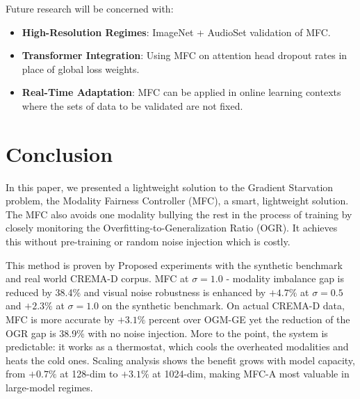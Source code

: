 \documentclass[fleqn,10pt]{wlscirep}
\begin{document}
Future research will be concerned with:
\begin{itemize}
    \item \textbf{High-Resolution Regimes}: ImageNet + AudioSet \cite{gemmeke2017audio} validation of MFC.
    \item \textbf{Transformer Integration}: Using MFC on attention head dropout rates in place of global loss weights.
    \item \textbf{Real-Time Adaptation}: MFC can be applied in online learning contexts where the sets of data to be validated are not fixed.
\end{itemize}

\section{Conclusion}
In this paper, we presented a lightweight solution to the Gradient Starvation problem, the Modality Fairness Controller (MFC), a smart, lightweight solution. The MFC also avoids one modality bullying the rest in the process of training by closely monitoring the Overfitting-to-Generalization Ratio (OGR). It achieves this without pre-training or random noise injection which is costly.

This method is proven by Proposed experiments with the synthetic benchmark and real world CREMA-D corpus. MFC at $\sigma{=}1.0$ - modality imbalance gap is reduced by 38.4\% and visual noise robustness is enhanced by $+4.7\%$ at $\sigma{=}0.5$ and $+2.3\%$ at $\sigma{=}1.0$ on the synthetic benchmark. On actual CREMA-D data, MFC is more accurate by $+3.1\%$ percent over OGM-GE yet the reduction of the OGR gap is 38.9\% with no noise injection. More to the point, the system is predictable: it works as a thermostat, which cools the overheated modalities and heats the cold ones. Scaling analysis shows the benefit grows with model capacity, from $+0.7\%$ at 128-dim to $+3.1\%$ at 1024-dim, making MFC-A most valuable in large-model regimes.
\end{document}
